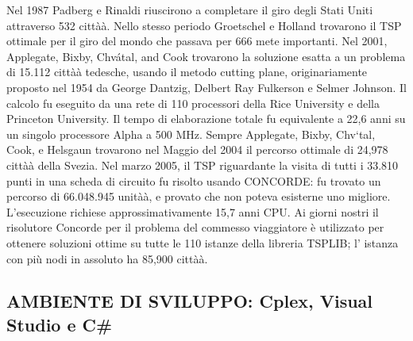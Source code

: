 \documentclass[11pt]{article}
\begin{document}
Nel 1987  Padberg e Rinaldi riuscirono a completare il giro degli Stati Uniti attraverso 532 città\`a. Nello stesso periodo Groetschel e Holland trovarono il TSP ottimale per il giro del mondo che passava per 666 mete importanti. 
Nel 2001, Applegate, Bixby, Chvátal, and Cook trovarono la soluzione esatta a un problema di 15.112 città\`a tedesche, usando il metodo cutting plane, originariamente proposto nel 1954 da George Dantzig, Delbert Ray Fulkerson e Selmer Johnson. Il calcolo fu eseguito da una rete di 110 processori della Rice University e della Princeton University. Il tempo di elaborazione totale fu equivalente a 22,6 anni su un singolo processore Alpha a 500 MHz.
Sempre Applegate, Bixby, Chv\a`tal, Cook, e Helsgaun trovarono nel Maggio del 2004 il percorso ottimale di 24,978 città\`a della Svezia. 
Nel marzo 2005, il TSP riguardante la visita di tutti i 33.810 punti in una scheda di circuito fu risolto usando CONCORDE: fu trovato un percorso di 66.048.945 unità\`a, e provato che non poteva esisterne uno migliore. L'esecuzione richiese approssimativamente 15,7 anni CPU. 
Ai giorni nostri il risolutore Concorde per il problema del commesso viaggiatore è utilizzato per ottenere soluzioni ottime su tutte le 110 istanze della libreria TSPLIB; l' istanza con più nodi in assoluto ha 85,900 città\`a. 


\subsection*{AMBIENTE DI SVILUPPO: Cplex, Visual Studio e C\#}
\label{sec:AmbienteSviluppoS}
\end{document}

